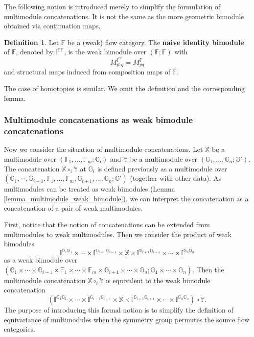 \documentclass[reqno, 10pt]{amsart}
\numberwithin{equation}{section}
\numberwithin{equation}{section}
\theoremstyle{definition}
\newtheorem{defn}[thm]{Definition}
\theoremstyle{remark}
\newcommand{\beqn}{\begin{equation*}}
\newcommand{\eeqn}{\end{equation*}}
\newcommand{\mb}{\mathbb}
\begin{document}
The following notion is introduced merely to simplify the formulation of multimodule concatenations. It is not the same as the more geometric bimodule obtained via continuation maps.

\begin{defn}
Let ${\mb F}$ be a (weak) flow category. The {\bf naive identity bimodule} of ${\mb F}$, denoted by ${\mb I}^{\mb{FF}}$, is the weak bimodule over $({\mb F}; {\mb F})$ with
\beqn
M_{p;q}^{{\mb I}^{\mb{FF}}} = M_{pq}^{\mb F}
\eeqn
and structural maps induced from composition maps of ${\mb F}$.
\end{defn}

The case of homotopies is similar. We omit the definition and the corresponding lemma. 


\subsubsection{Multimodule concatenations as weak bimodule concatenations}

Now we consider the situation of multimodule concatenations.  Let ${\mb X}$ be a multimodule over $({\mb F}_1, \ldots, {\mb F}_m; {\mb G}_i)$ and ${\mb Y}$ be a multimodule over $({\mb G}_1, \ldots, {\mb G}_n; {\mb G}')$. The concatenation ${\mb X} \circ_i {\mb Y}$ at ${\mb G}_i$ is defined previously as a multimodule over $({\mb G}_1, \cdots, {\mb G}_{i-1}, {\mb F}_1, \ldots, {\mb F}_m, {\mb G}_{i+1}, \ldots, {\mb G}_n; {\mb G}')$ (together with other data). As multimodules can be treated as weak bimodules (Lemma \ref{lemma_multimodule_weak_bimodule}), we can interpret the concatenation as a concatenation of a pair of weak multimodules. 



First, notice that the notion of concatenations can be extended from multimodules to weak multimodules. Then we consider the product of weak bimodules
\beqn
{\mb I}^{{\mb G}_1{\mb G}_1} \times \cdots \times {\mb I}^{{\mb G}_{i-1} {\mb G}_{i-1}} \times {\mb X} \times {\mb I}^{\mb{G}_{i+1} \mb{G}_{i+1}} \times \cdots \times \mb{I}^{\mb{G}_n \mb{G}_n}
\eeqn
as a weak bimodule over $({\mb G}_1 \times \cdots \times {\mb G}_{i-1} \times {\mb F}_1 \times \cdots \times {\mb F}_m \times {\mb G}_{i+1} \times \cdots \times {\mb G}_n; {\mb G}_1 \times \cdots \times {\mb G}_n)$. Then the multimodule concatenation ${\mb X} \circ_i {\mb Y}$ is equivalent to the weak bimodule concatenation 
\beqn
({\mb I}^{{\mb G}_1{\mb G}_1} \times \cdots \times {\mb I}^{{\mb G}_{i-1} {\mb G}_{i-1}} \times {\mb X} \times {\mb I}^{\mb{G}_{i+1} \mb{G}_{i+1}} \times \cdots \times \mb{I}^{\mb{G}_n \mb{G}_n}) \circ {\mb Y}.
\eeqn
The purpose of introducing this formal notion is to simplify the definition of equivariance of multimodules when the symmetry group permutes the source flow categories. 
\end{document}
